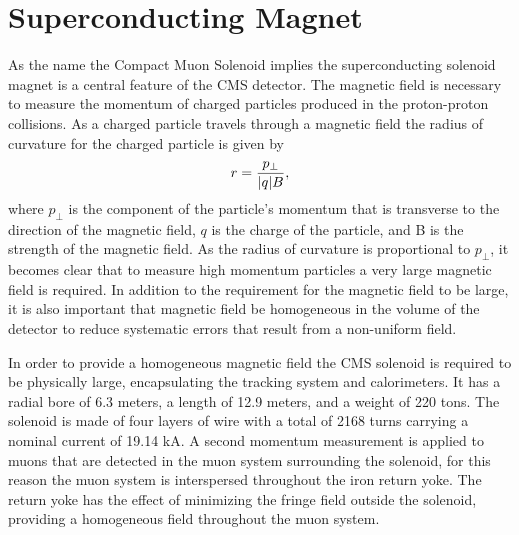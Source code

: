 \section{Superconducting Magnet}
\label{sec:magnet}
As the name the Compact Muon Solenoid implies the superconducting solenoid magnet is a central feature of the CMS detector.
The magnetic field is necessary to measure the momentum of charged particles produced in the proton-proton collisions.
As a charged particle travels through a magnetic field the radius of curvature for the charged particle is given by
\begin{equation}
r = {p_{\perp}\over|q|B},
\end{equation}
where $p_{\perp}$ is the component of the particle's momentum that is transverse to the direction of the magnetic field, $q$ is the charge of the particle, and B is the strength of the magnetic field.
As the radius of curvature is proportional to $p_{\perp}$, it becomes clear that to measure high momentum particles a very large magnetic field is required.
In addition to the requirement for the magnetic field to be large, it is also important that magnetic field be homogeneous in the volume of the detector to reduce systematic errors that result from a non-uniform field.

In order to provide a homogeneous magnetic field the CMS solenoid is required to be physically large, encapsulating the tracking system and calorimeters.
It has a radial bore of 6.3 meters, a length of 12.9 meters, and a weight of 220 tons.
The solenoid is made of four layers of wire with a total of 2168 turns carrying a nominal current of 19.14 kA.
A second momentum measurement is applied to muons that are detected in the muon system surrounding the solenoid, for this reason the muon system is interspersed throughout the iron return yoke.
The return yoke has the effect of minimizing the fringe field outside the solenoid, providing a homogeneous field throughout the muon system. %
